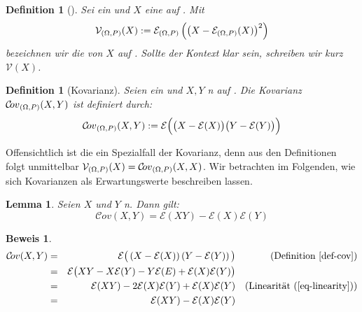 \documentclass[a4paper]{article}
\newtheorem{lemma}[satz]{Lemma}
\newtheorem{definition}[satz]{Definition} %
\theoremstyle{nonumberplain}
\newtheorem{beweis}{Beweis}
\begin{document}
\begin{definition}[\var]\label{def-var}
	Sei \probspaceex{} ein \probspace{} und $X$ eine \rvar{} auf \probspaceex{}. Mit
	\begin{equation}
		\mathcal{V}_{(\Omega, P){}}(X) :=  \mathcal{E}_{(\Omega, P){}}\left(\left(X - \mathcal{E}_{(\Omega, P){}} (X)\right)^{2}\right)
	\end{equation}
	bezeichnen wir die \var{} von $X$ auf  \probspaceex{}. Sollte der Kontext \probspaceex{} klar sein, schreiben wir kurz $\mathcal{V}(X)$.
\end{definition}
\newcommand{\cov}{Kovarianz}
\newcommand{\mcov}{\mathcal{C}\!ov}
\begin{definition}[\cov]\label{def-cov}
	Seien \probspaceex{} ein \probspace{} und $X, Y$ \rvar n auf \probspaceex{}. Die Kovarianz $\mcov{}_{\probspaceexraw}(X,Y)$ ist definiert durch:
	\begin{equation}
		\mcov{}_{\probspaceexraw}(X,Y) := \mathcal{E} \Big( \big(X - \mathcal{E}(X)\big)\big(Y - \mathcal{E}(Y) \big)\Big)
	\end{equation}
\end{definition}

Offensichtlich ist die \var{} ein Spezialfall der \cov{}, denn aus den Definitionen folgt unmittelbar $\mathcal{V}_{\probspaceexraw}(X) = \mcov{}_{\probspaceexraw}(X,X)$. Wir betrachten im Folgenden, wie sich Kovarianzen als Erwartungswerte beschreiben lassen.

\begin{lemma}\label{lemma-cov-exp}
	Seien $X$ und $Y$ \rvar{}n. Dann gilt:
\begin{equation}
	\mcov{}(X,Y) = \mathcal{E}(XY) - \mathcal{E}(X)\mathcal{E}(Y)
\end{equation}
\end{lemma}
\begin{beweis}
\begin{align*}
\mcov{}(X,Y) & = & \mathcal{E}\big( \left(X - \mathcal{E}(X)\right)\left(Y - \mathcal{E}(Y)\right)\big) && \text{(Definition \ref{def-cov})} \\
& = & \mathcal{E}\big(XY - X \mathcal{E}(Y) - Y \mathcal{E}(E) + \mathcal{E}(X)\mathcal{E}(Y)\big) \\
& = & \mathcal{E}(XY) - 2 \mathcal{E}(X) \mathcal{E}(Y) + \mathcal{E}(X) \mathcal{E}(Y) && \text{(Linearität (\ref{eq-linearity}))}\\
& = & \mathcal{E}(XY) - \mathcal{E}(X)\mathcal{E}(Y) \\
\end{align*}
\end{beweis}
\end{document}
